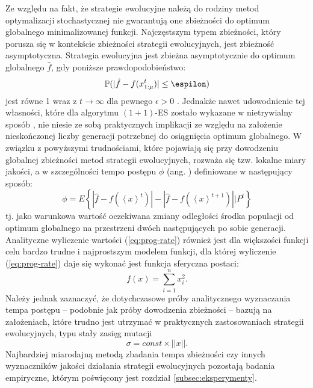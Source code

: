     Ze względu na fakt, że strategie ewolucyjne należą do rodziny metod optymalizacji stochastycznej nie gwarantują one zbieżności do optimum globalnego minimalizowanej funkcji.
    Najczęstszym typem zbieżności, który porusza się w kontekście zbieżności strategii ewolucyjnych, jest zbieżność asymptotyczna. Strategia ewolucyjna jest zbieżna asymptotycznie do optimum globalnego $\hat f$, gdy poniższe prawdopodobieństwo:
    \begin{equation*}
        \mathbb{P}(|\hat{f} - f(x^{t}_{1:\mu})| \leq \espilon)
    \end{equation*}
    jest równe 1 wraz z $t \rightarrow \infty$ dla pewnego $\epsilon >0$ \source.
    Jednakże nawet udowodnienie tej własności, które dla algorytmu $(1+1)$-ES zostało wykazane w nietrywialny sposób \source, nie niesie ze sobą praktycznych implikacji ze względu na założenie nieskończonej liczby generacji potrzebnej do osiągnięcia optimum globalnego.
    W związku z powyższymi trudnościami, które pojawiają się przy dowodzeniu globalnej zbieżności metod strategii ewolucyjnych, rozważa się tzw. lokalne miary jakości, a w szczególności tempo postępu $\phi$ (ang. ) definiowane w następujący sposób: 
    \begin{equation}
        \label{eq:prog-rate}
        \phi = E\left\{|\hat{f} - f(\left<x\right>^{t})| - |\hat{f} - f(\left<x\right>^{t+1})| |P^{t} \right\}
    \end{equation}
    tj. jako warunkowa wartość oczekiwana zmiany odległości środka populacji od optimum globalnego na przestrzeni dwóch następujących po sobie generacji. Analityczne wyliczenie wartości (\ref{eq:prog-rate}) również jest dla większości funkcji celu bardzo trudne i najprostszym modelem funkcji, dla której wyliczenie (\ref{eq:prog-rate}) daje się wykonać jest funkcja sferyczna postaci:
    \begin{equation*}
        f(x) = \sum^{n}_{i = 1}x^{2}_{i}.
    \end{equation*}
    Należy jednak zaznaczyć, że dotychczasowe próby analitycznego wyznaczania tempa postępu -- podobnie jak próby dowodzenia zbieżności -- bazują na założeniach, które trudno jest utrzymać w praktycznych zastosowaniach strategii ewolucyjnych, typu stały zasięg mutacji
    \begin{equation*}
        \sigma = const\times||x||.
    \end{equation*}
    Najbardziej miarodajną metodą zbadania tempa zbieżności czy innych wyznaczników jakości działania strategii ewolucyjnych pozostają badania empiryczne, którym poświęcony jest rozdział \ref{subsec:eksperymenty}. 

